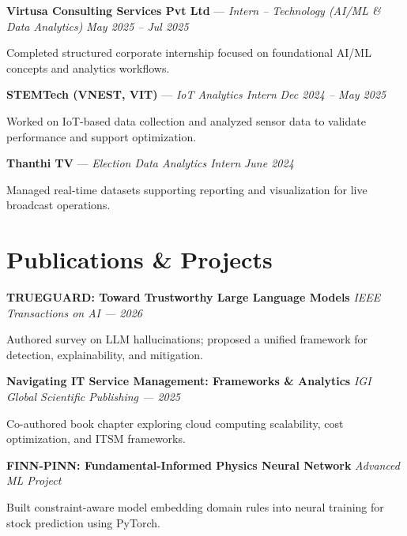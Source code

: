 \documentclass[letterpaper,10pt]{article}
\newenvironment{resume_list}{
  \vspace{-7pt}
  \begin{itemize}[itemsep=-3px, parsep=0pt, leftmargin=30pt]
}{
  \end{itemize}
}
\begin{document}
\textbf{Virtusa Consulting Services Pvt Ltd} — \textit{Intern – Technology (AI/ML \& Data Analytics)} \hfill \textit{May 2025 -- Jul 2025}
\begin{resume_list}
  \item Completed structured corporate internship focused on foundational AI/ML concepts and analytics workflows.
\end{resume_list}

\textbf{STEMTech (VNEST, VIT)} — \textit{IoT Analytics Intern} \hfill \textit{Dec 2024 -- May 2025}
\begin{resume_list}
  \item Worked on IoT-based data collection and analyzed sensor data to validate performance and support optimization.
\end{resume_list}

\textbf{Thanthi TV} — \textit{Election Data Analytics Intern} \hfill \textit{June 2024}
\begin{resume_list}
  \item Managed real-time datasets supporting reporting and visualization for live broadcast operations.
\end{resume_list}

\section{Publications \& Projects}

\textbf{TRUEGUARD: Toward Trustworthy Large Language Models} \hfill \textit{IEEE Transactions on AI — 2026}
\begin{resume_list}
  \item Authored survey on LLM hallucinations; proposed a unified framework for detection, explainability, and mitigation.
\end{resume_list}

\textbf{Navigating IT Service Management: Frameworks \& Analytics} \hfill \textit{IGI Global Scientific Publishing — 2025}
\begin{resume_list}
  \item Co-authored book chapter exploring cloud computing scalability, cost optimization, and ITSM frameworks.
\end{resume_list}

\textbf{FINN-PINN: Fundamental-Informed Physics Neural Network} \hfill \textit{Advanced ML Project}
\begin{resume_list}
  \item Built constraint-aware model embedding domain rules into neural training for stock prediction using PyTorch.
\end{resume_list}
\end{document}
